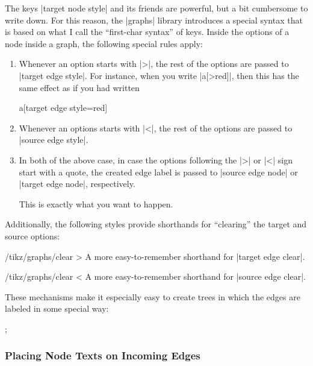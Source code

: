 The keys |target node style| and its friends are powerful, but a bit cumbersome
to write down. For this reason, the |graphs| library introduces a special
syntax that is based on what I call the ``first-char syntax'' of keys. Inside
the options of a node inside a graph, the following special rules apply:
%
\begin{enumerate}
    \item Whenever an option starts with |>|, the rest of the options are
        passed to |target edge style|. For instance, when you write |a[>red]|,
        then this has the same effect as if you had written
\begin{codeexample}
a[target edge style={red}]
\end{codeexample}
    \item Whenever an options starts with |<|, the rest of the options are
        passed to |source edge style|.
    \item In both of the above case, in case the options following the |>| or
        |<| sign start with a quote, the created edge label is passed to
        |source edge node| or |target edge node|, respectively.

        This is exactly what you want to happen.
\end{enumerate}
%
Additionally, the following styles provide shorthands for ``clearing'' the
target and source options:
%
\begin{key}{/tikz/graphs/clear >}
    A more easy-to-remember shorthand for |target edge clear|.
\end{key}
%
\begin{key}{/tikz/graphs/clear <}
    A more easy-to-remember shorthand for |source edge clear|.
\end{key}

These mechanisms make it especially easy to create trees in which the edges are
labeled in some special way:
%
\begin{codeexample}[]
\tikz
  ;
\end{codeexample}


\subsubsection{Placing Node Texts on Incoming Edges}

